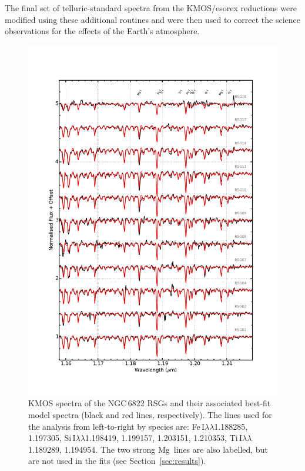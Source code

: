 The final set of telluric-standard spectra from the KMOS/esorex reductions were modified using these additional routines and were then used to correct the science observations for the effects of the Earth's atmosphere.



\begin{figure}
 \centering
 \begin{center}
\includegraphics[width=\textwidth]{ngc6822/N6822_mod_fit.pdf}
\caption[Observed and best-fit model spectra]{
KMOS spectra of the NGC\,6822 RSGs and their associated best-fit model spectra
(black and red lines, respectively).
The lines used for the analysis from left-to-right by species are:
Fe\,I$\lambda\lambda$1.188285,
1.197305,
Si\,I$\lambda\lambda$1.198419,
1.199157,
1.203151,
1.210353,
Ti\,I$\lambda\lambda$1.189289,
1.194954.
The two strong Mg\,\1 lines are also labelled, but are not used in the fits
(see Section~\ref{sec:results}).
         }
\label{fig:model_fits}
\end{center}
\end{figure}


